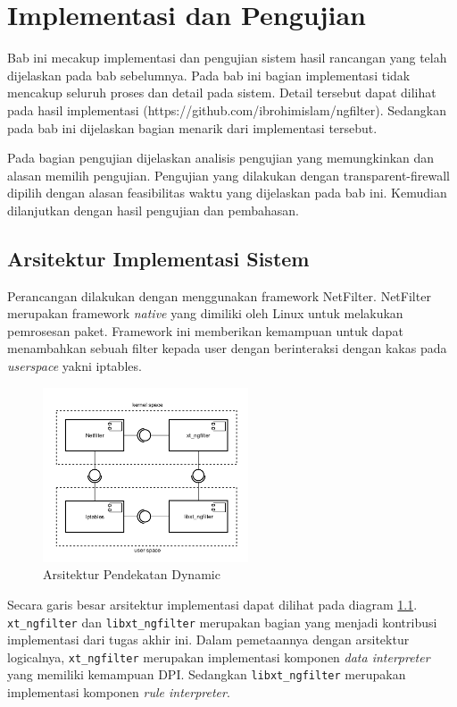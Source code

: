 \chapter{Implementasi dan Pengujian}

Bab ini mecakup implementasi dan pengujian sistem hasil rancangan yang telah dijelaskan pada bab sebelumnya. Pada bab ini bagian implementasi tidak mencakup seluruh proses dan detail pada sistem. Detail tersebut dapat dilihat pada hasil implementasi (https://github.com/ibrohimislam/ngfilter). Sedangkan pada bab ini dijelaskan bagian menarik dari implementasi tersebut.

Pada bagian pengujian dijelaskan analisis pengujian yang memungkinkan dan alasan memilih pengujian. Pengujian yang dilakukan dengan transparent-firewall dipilih dengan alasan feasibilitas waktu yang dijelaskan pada bab ini. Kemudian dilanjutkan dengan hasil pengujian dan pembahasan.

\section{Arsitektur Implementasi Sistem}
Perancangan dilakukan dengan menggunakan framework NetFilter. NetFilter merupakan framework \textit{native} yang dimiliki oleh Linux untuk melakukan pemrosesan paket. Framework ini memberikan kemampuan untuk dapat menambahkan sebuah filter kepada user dengan berinteraksi dengan kakas pada \textit{userspace} yakni iptables.

\begin{figure}[H]
	\centering
	\includegraphics[width=230px]{resources/ngfilter_architecture.png}
	\caption{Arsitektur Pendekatan Dynamic}
	\label{fig:ngfilter_architecture}
\end{figure}

Secara garis besar arsitektur implementasi dapat dilihat pada diagram \ref{fig:ngfilter_architecture}. \verb|xt_ngfilter| dan \verb|libxt_ngfilter| merupakan bagian yang menjadi kontribusi implementasi dari tugas akhir ini. Dalam pemetaannya dengan arsitektur logicalnya, \verb|xt_ngfilter| merupakan implementasi komponen \textit{data interpreter} yang memiliki kemampuan DPI. Sedangkan \verb|libxt_ngfilter| merupakan implementasi komponen \textit{rule interpreter}.

